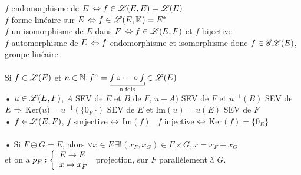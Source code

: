 \documentclass[12 pt]{book}
\begin{document}
\begin{flushleft}
\begin{doublespace}

	$f$ endomorphisme de $E \, \Leftrightarrow f\in \mathscr{L}(E,E) = \mathscr{L}(E)$\\
	$f$ forme linéaire sur $E \, \Leftrightarrow f\in \mathscr{L}(E,\mathbb{K}) = E^*$\\
	$f$ un isomorphisme de $E$ dans $F \, \Leftrightarrow f\in\mathscr{L}(E,F)$ et $f$ bijective\\
	$f$ automorphisme de $E \, \Leftrightarrow f$ endomorphisme et isomorphisme donc $f\in \mathscr{G}\mathscr{L}(E)$, groupe linéaire\\

	\text{ }\\
	Si $f\in\mathscr{L}(E)$ et $n\in\N , f^n = \underset{\text{n fois}}{\underbracket[0.5pt]{f\circ \cdots \circ f}} \in\sL(E)$\\
	• $u\in\mathscr{L}(E,F)$, $A$ SEV de $E$ et $B$ de $F$, $u-A)$ SEV de $F$ et $u^{-1}(B)$ SEV de $E \Rightarrow$ Ker($u) = u^{- 1} (\{0_F\})$ SEV de $E$ et Im$(u) = u(E)$ SEV de $F$\\
	• $f\in\mathscr{L}(E,F)$, $f$ surjective $\Leftrightarrow$ Im$(f)$ \ $f$ injective $\Leftrightarrow$ Ker$(f) = \{0_E\}$\\
	
	\text{ }\\
	• Si $F\oplus G = E$, alors $\forall x\in E \, \exists ! (x_F,x_G)\in F\times G, x=x_F+x_G$\\
	 et on a $p_F : \left\{\begin{array}{ll} E \rightarrow E \\ x\mapsto x_F \end{array} \right.$ projection, sur $F$ parallèlement à $G$.\\
	 

\end{doublespace}
\end{flushleft}
\end{document}
